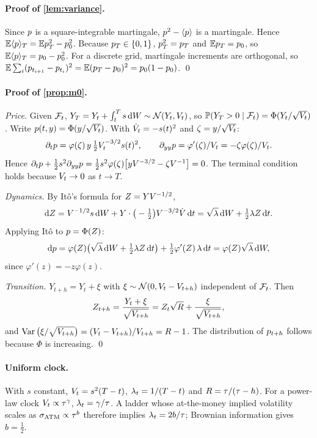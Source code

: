 \paragraph{Proof of \cref{lem:variance}.}
Since $p$ is a square-integrable martingale, $p^2-\langle p\rangle$ is a martingale. Hence
$\mathbb{E}\langle p\rangle_T=\mathbb{E}p_T^2-p_0^2$. Because $p_T\in\{0,1\}$, $p_T^2=p_T$ and
$\mathbb{E}p_T=p_0$, so $\mathbb{E}\langle p\rangle_T=p_0-p_0^2$. For a discrete grid, martingale
increments are orthogonal, so
$\mathbb{E}\sum_i(p_{t_{i+1}}-p_{t_i})^2=\mathbb{E}(p_T-p_0)^2=p_0(1-p_0)$. \qed

\paragraph{Proof of \cref{prop:m0}.}
\emph{Price.} Given $\mathcal{F}_t$, $Y_T=Y_t+\int_t^T s\,\mathrm{d} W\sim\mathcal{N}(Y_t,V_t)$, so
$\mathbb{P}(Y_T>0\mid\mathcal{F}_t)=\Phi(Y_t/\sqrt{V_t})$. Write $p(t,y)=\Phi(y/\sqrt{V_t})$. With
$\dot{V}_t=-s(t)^2$ and $\zeta=y/\sqrt{V_t}$:
\[
  \partial_tp=\varphi(\zeta)\,y\,\tfrac12V_t^{-3/2}s(t)^2,\qquad
  \partial_{yy}p=\varphi'(\zeta)/V_t=-\zeta\varphi(\zeta)/V_t .
\]
Hence $\partial_tp+\tfrac12 s^2\partial_{yy}p
=\tfrac12 s^2\varphi(\zeta)\big[yV^{-3/2}-\zeta V^{-1}\big]=0$. The terminal condition holds
because $V_t\to0$ as $t\to T$.

\emph{Dynamics.} By It\^o's formula for $Z=YV^{-1/2}$,
\[
  \mathrm{d}Z=V^{-1/2}s\,\mathrm{d} W+Y\cdot\big(-\tfrac12\big)V^{-3/2}\dot{V}\,\mathrm{d} t
  =\sqrt{\lambda}\,\mathrm{d} W+\tfrac12\lambda Z\,\mathrm{d} t .
\]
Applying It\^o to $p=\Phi(Z)$:
\[
  \mathrm{d}p=\varphi(Z)\big(\sqrt{\lambda}\,\mathrm{d} W+\tfrac12\lambda Z\,\mathrm{d} t\big)+\tfrac12\varphi'(Z)\,\lambda\,\mathrm{d} t
  =\varphi(Z)\sqrt{\lambda}\,\mathrm{d} W ,
\]
since $\varphi'(z)=-z\varphi(z)$.

\emph{Transition.} $Y_{t+h}=Y_t+\xi$ with $\xi\sim\mathcal{N}(0,V_t-V_{t+h})$ independent of $\mathcal{F}_t$.
Then
\[
  Z_{t+h}=\frac{Y_t+\xi}{\sqrt{V_{t+h}}}=Z_t\sqrt{R}+\frac{\xi}{\sqrt{V_{t+h}}},
\]
and $\operatorname{Var}\big(\xi/\sqrt{V_{t+h}}\big)=(V_t-V_{t+h})/V_{t+h}=R-1$. The distribution of
$p_{t+h}$ follows because $\Phi$ is increasing. \qed

\paragraph{Uniform clock.} With $s$ constant, $V_t=s^2(T-t)$, $\lambda_t=1/(T-t)$ and
$R=\tau/(\tau-h)$. For a power-law clock $V_t\propto\tau^{\gamma}$, $\lambda_t=\gamma/\tau$.
A ladder whose at-the-money implied volatility scales as $\sigma_{\mathrm{ATM}}\propto\tau^{b}$ therefore implies
$\lambda_t=2b/\tau$; Brownian information gives $b=\tfrac12$.

